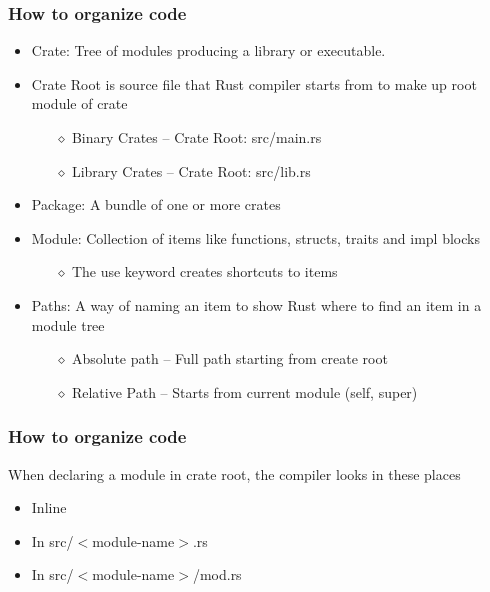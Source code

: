 \documentclass{beamer}
\begin{document}
\begin{frame}
    \frametitle{How to organize code}
    \begin{itemize}
        \item Crate: Tree of modules producing a library or executable.
        \item Crate Root is source file that Rust compiler starts from to make up root module of crate
        \begin{itemize}
            \item[$\diamond$] Binary Crates – Crate Root: src/main.rs
            \item[$\diamond$] Library Crates – Crate Root: src/lib.rs
        \end{itemize}
        \vspace{\baselineskip}
        \item Package: A bundle of one or more crates
        \vspace{\baselineskip}
        \item Module: Collection of items like functions, structs, traits and impl blocks                \begin{itemize}
            \item[$\diamond$] The use keyword creates shortcuts to items
        \end{itemize}
        \vspace{\baselineskip}
        \item Paths: A way of naming an item to show Rust where to find an item in a module tree
        \begin{itemize}
            \item[$\diamond$] Absolute path – Full path starting from create root
            \item[$\diamond$] Relative Path – Starts from current module (self, super)
        \end{itemize}
    \end{itemize}
\end{frame}


\begin{frame}
    \frametitle{How to organize code}
    When declaring a module in crate root, the compiler looks in these places
    \begin{itemize}
        \item Inline
        \item In src/$<$module-name$>$.rs
        \item In src/$<$module-name$>$/mod.rs
     \end{itemize}
\end{frame}
\end{document}
